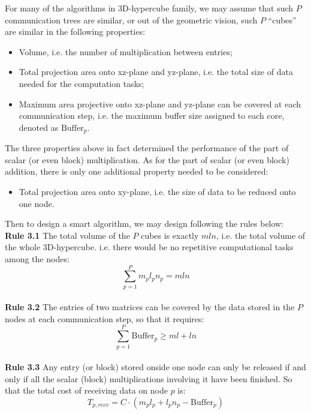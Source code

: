\documentclass{amsart}
\theoremstyle{definition}
\theoremstyle{remark}
\numberwithin{equation}{section}
\begin{document}
	For many of the algorithms in 3D-hypercube family, we may assume that such $P$ communication trees are similar, or out of the geometric vision, such $P$ “cubes” are similar in the following properties:\par
\begin{itemize}
\item Volume, i.e. the number of multiplication between entries;
\item Total projection area onto xz-plane and yz-plane, i.e. the total size of data needed for the computation tasks;
\item Maximum area projective onto xz-plane and yz-plane can be covered at each communication step, i.e. the maximum buffer size assigned to each core, denoted as $\text{Buffer}_p$.
\end{itemize}

The three properties above in fact determined the performance of the part of scalar (or even block) multiplication. As for the part of scalar (or even block) addition, there is only one additional property needed to be considered:\par
\begin{itemize}
\item Total projection area onto xy-plane, i.e. the size of data to be reduced onto one node.
\end{itemize}

Then to design a smart algorithm, we may design following the rules below:\\
\textbf{Rule 3.1} The total volume of the $P$ cubes is exactly $mln$, i.e. the total volume of the whole 3D-hypercube. i.e. there would be no repetitive computational tasks among the nodes:
\begin{equation}
\sum_{p=1}^{P}m_pl_pn_p=mln
\end{equation}
\\
\textbf{Rule 3.2} The entries of two matrices can be covered by the data stored in the $P$ nodes at each communication step, so that it requires:
\begin{equation}
\sum_{p=1}^{P}\text{Buffer}_p\ge ml+ln
\end{equation}
\\
\textbf{Rule 3.3} Any entry (or block) stored onside one node can only be released if and only if all the scalar (block) multiplications involving it have been finished. So that the total cost of receiving data on node $p$ is:
\begin{equation}
T_{p,recv}=C\cdot(m_pl_p+l_pn_p-\text{Buffer}_p)
\end{equation}
\end{document}
